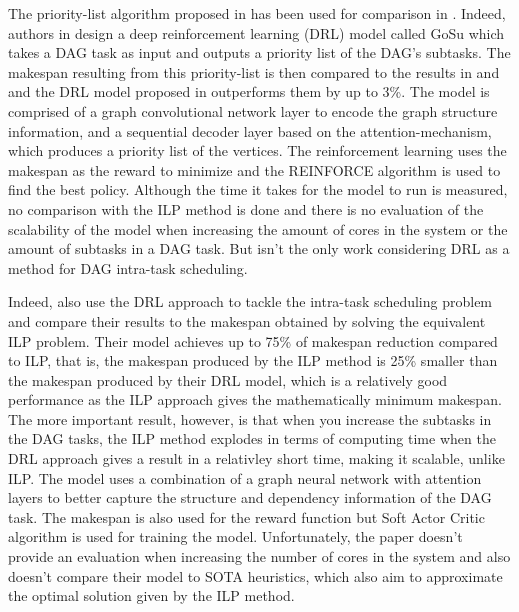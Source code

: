 The priority-list algorithm proposed in \cite{Zhao2022DAGsched}
has been used for comparison in \cite{Lee2021GlobalDagSchedDRL}.
Indeed, authors in \cite{Lee2021GlobalDagSchedDRL}
design a deep reinforcement learning (DRL) model called GoSu 
which takes a DAG task as input and outputs 
a priority list of the DAG's subtasks.
The makespan resulting from this priority-list is 
then compared to the results in \cite{Zhao2022DAGsched} and \cite{He2019DagIntra}
and the DRL model proposed in \cite{Lee2021GlobalDagSchedDRL}
outperforms them by up to 3\%.
The model is comprised of a graph convolutional network 
layer to encode the graph structure information,
and a sequential decoder layer based on the attention-mechanism,
which produces a priority list of the vertices.
The reinforcement learning uses the makespan as the reward to minimize
and the REINFORCE algorithm is used to find the best policy.
Although the time it takes for the model to run is measured,
no comparison with the ILP method is done and 
there is no evaluation of the scalability of the model 
when increasing the amount of cores in the system or the amount of subtasks in a DAG task.
But \cite{Lee2021GlobalDagSchedDRL} isn't the only work considering 
DRL as a method for DAG intra-task scheduling.

Indeed, \cite{Zhao2024GATDRLmodel} also 
use the DRL approach to tackle the intra-task scheduling 
problem and compare their results to the makespan
obtained by solving the equivalent ILP problem.
Their model achieves up to 75\% of makespan 
reduction compared to ILP, that is, the makespan 
produced by the ILP method is 25\% smaller than the 
makespan produced by their DRL model,
which is a relatively good performance as 
the ILP approach gives the mathematically minimum makespan.
The more important result, however,
is that when you increase the subtasks in the DAG tasks,
the ILP method explodes in terms of computing
time when the DRL approach gives a result in a relativley short time,
making it scalable, unlike ILP.
The model uses a combination of a graph neural network 
with attention layers to better capture 
the structure and dependency information of the DAG task.
The makespan is also used for the reward function but 
Soft Actor Critic algorithm is used for training the model. 
Unfortunately, the paper doesn't provide 
an evaluation when increasing the number of cores 
in the system and also doesn't compare their model 
to SOTA heuristics, which also aim to approximate 
the optimal solution given by the ILP method.\\

